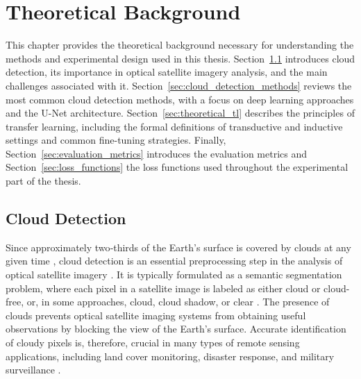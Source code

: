 \chapter{Theoretical Background} \label{chap:theoretical_background}

This chapter provides the theoretical background necessary for understanding the methods and experimental design used in this thesis. Section~\ref{sec:cloud_detection} introduces cloud detection, its importance in optical satellite imagery analysis, and the main challenges associated with it. Section~\ref{sec:cloud_detection_methods} reviews the most common cloud detection methods, with a focus on deep learning approaches and the U-Net architecture. Section~\ref{sec:theoretical_tl} describes the principles of transfer learning, including the formal definitions of transductive and inductive settings and common fine-tuning strategies. Finally, Section~\ref{sec:evaluation_metrics} introduces the evaluation metrics and Section~\ref{sec:loss_functions} the loss functions used throughout the experimental part of the thesis.


\section{Cloud Detection}
\label{sec:cloud_detection}

Since approximately two‑thirds of the Earth's surface is covered by clouds at any given time \cite{king2013}, cloud detection is an essential preprocessing step in the analysis of optical satellite imagery \cite{zhiwei2022}. It is typically formulated as a semantic segmentation problem, where each pixel in a satellite image is labeled as either cloud or cloud-free, or, in some approaches, cloud, cloud shadow, or clear \cite{wang2024}. The presence of clouds prevents optical satellite imaging systems from obtaining useful observations by blocking the view of the Earth's surface. Accurate identification of cloudy pixels is, therefore, crucial in many types of remote sensing applications, including land cover monitoring, disaster response, and military surveillance \cite{wang2024, singh2025}.

